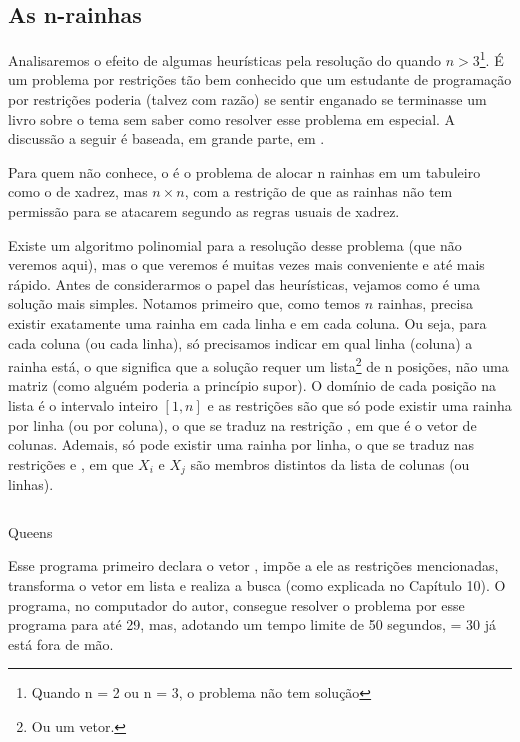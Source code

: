 \subsection{As n-rainhas}

Analisaremos o efeito de algumas heurísticas pela resolução do  quando $n > 3$\footnote{Quando n = 2 ou n = 3, o problema não tem solução}. É um
problema por restrições tão bem conhecido que um estudante de programação por
restrições poderia (talvez com razão) se sentir enganado se terminasse um livro sobre o tema sem saber
como resolver esse problema em especial. A discussão a seguir é baseada, em grande parte, em
\cite{krzysztof}.

Para quem não conhece, o  é o problema de alocar n rainhas em um
tabuleiro como o de xadrez, mas $n\times n$, com a restrição de que as rainhas não tem permissão
para se atacarem segundo as regras usuais de xadrez.

Existe um algoritmo polinomial para a resolução desse problema (que não veremos aqui), mas o que
veremos é muitas vezes mais conveniente e até mais rápido. Antes de considerarmos o papel das
heurísticas, vejamos como é uma solução mais simples. Notamos primeiro que, como temos $n$ rainhas,
precisa existir exatamente uma rainha em cada linha e em cada coluna. Ou seja, para cada coluna (ou
cada linha), só precisamos indicar em qual linha (coluna) a rainha está, o que significa que a solução requer um
lista\footnote{Ou um vetor.} de n posições, não uma matriz (como alguém poderia a princípio supor). O domínio de cada
posição na lista é o intervalo inteiro $[1,n]$ e as restrições são que só pode existir uma rainha
por linha (ou por coluna), o que se traduz na restrição , em que
 é o vetor de colunas. Ademais, só pode existir uma rainha por linha, o que se traduz nas
restrições  e , em que $X_i$ e $X_j$ são membros distintos da lista de colunas (ou linhas).

    \begin{listing}[H]
    \inputminted{prolog}{../Exemplos/Cap11/prog1_queens.ecl}
    \caption{Queens}
    \end{listing}

Esse programa primeiro declara o vetor , impõe a ele as restrições mencionadas,
transforma o vetor em lista e realiza a busca (como explicada no Capítulo 10).%
O programa, no computador do autor, consegue resolver o problema por esse programa para  até 29,
mas, adotando um tempo limite de 50 segundos,  = 30 já está fora de mão.

